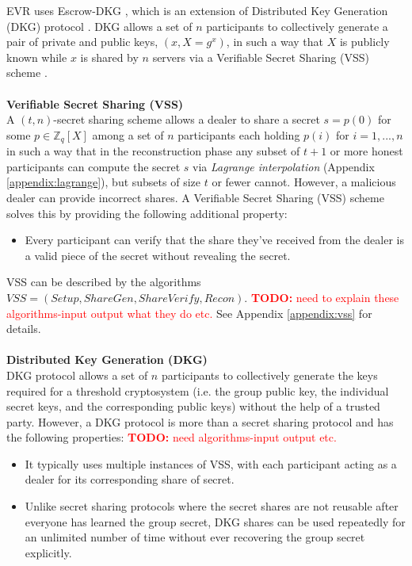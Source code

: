 \documentclass[letterpaper,twocolumn,10pt]{article}
\theoremstyle{definition}
\theoremstyle{remark}
\newcommand{\todo}[1]{\textcolor{red}{\textbf{TODO:} #1}}
\begin{document}
EVR uses Escrow-DKG \cite{david2019rational}, which is an extension of Distributed Key Generation (DKG) protocol \cite{gennaro1999secure, gennaro3revisiting}. DKG allows a set of $n$ participants to collectively generate a pair of private and public keys, $(x,X = g^x )$, in such a way that $X$ is publicly known while $x$ is shared by $n$ servers via a Verifiable Secret Sharing (VSS) scheme \cite{feldman1987practical, pedersen1991non}.\\\\
\textbf{Verifiable Secret Sharing (VSS)}\\
A $(t, n)$-secret sharing scheme \cite{shamir1979share, blakley1979safeguarding} allows a dealer to share a secret $s = p(0)$ for some $p \in \mathbb{Z}_q[X]$ among a set of $n$ participants each holding $p(i)$ for $i = 1, ..., n$ in such a way that in the reconstruction phase any subset of $t+1$ or more honest participants can compute the secret $s$ via \textit{Lagrange interpolation} (Appendix \ref{appendix:lagrange}), but subsets of size $t$ or fewer cannot. However, a malicious dealer can provide incorrect shares. A Verifiable Secret Sharing (VSS) scheme solves this by providing the following additional property:
\begin{itemize}
    \item Every participant can verify that the share they've received from the dealer is a valid piece of the secret without revealing the secret.
\end{itemize}
VSS can be described by the algorithms $VSS = (Setup, ShareGen, ShareVerify, Recon)$. \todo{need to explain these algorithms-input output what they do etc.}
See Appendix \ref{appendix:vss} for details.\\\\
\textbf{Distributed Key Generation (DKG)}\\
DKG protocol allows a set of $n$ participants to collectively generate the keys required for a threshold cryptosystem (i.e. the group public key, the individual secret keys, and the corresponding public keys) without the help of a trusted party. However, a DKG protocol is more than a secret sharing protocol and has the following properties:
\todo{need algorithms-input output etc.}
\begin{itemize}
    \item It typically uses multiple instances of VSS, with each participant acting as a dealer for its corresponding share of secret. 
    \item Unlike secret sharing protocols where the secret shares are not reusable after everyone has learned the group secret, DKG shares can be used repeatedly for an unlimited number of time without ever recovering the group secret explicitly.
\end{itemize}
\end{document}
